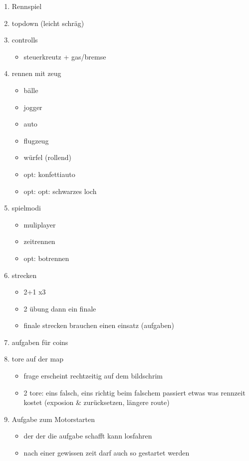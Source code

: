 	\begin{enumerate}
		\item{Rennspiel}
		\item{topdown (leicht schräg)}
		\item{controlls}
		\begin{itemize}
			\item{steuerkreutz + gas/bremse}
		\end{itemize}
		\item{rennen mit zeug}
		\begin{itemize}
			\item{bälle}
			\item{jogger}
			\item{auto}
			\item{flugzeug}
			\item{würfel (rollend)}
			\item{opt: konfettiauto}
			\item{opt: opt: schwarzes loch}
		\end{itemize}
		\item{spielmodi}
		\begin{itemize}
			\item{muliplayer}
			\item{zeitrennen}
			\item{opt: botrennen}
		\end{itemize}
		\item{strecken}
		\begin{itemize}
			\item{2+1 x3}
			\item{2 übung dann ein finale}
			\item{finale strecken brauchen einen einsatz (aufgaben)}
		\end{itemize}
		\item{aufgaben für coins}
		\item{tore auf der map}
		\begin{itemize}
			\item{frage erscheint rechtzeitig auf dem bildschrim}
			\item{2 tore: eins falsch, eins richtig}
				beim falschem passiert etwas was rennzeit kostet (exposion \& zurücksetzen, längere route)
		\end{itemize}
		\item{Aufgabe zum Motorstarten}
			\begin{itemize}
				\item{der der die aufgabe schafft kann losfahren}
				\item{nach einer gewissen zeit darf auch so gestartet werden}

\end{itemize}
\end{enumerate}
